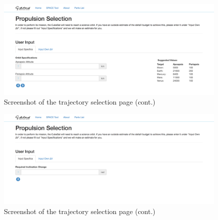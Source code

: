 \documentclass[a4, 12 pt]{article} %
\begin{document}
\begin{figure}[H]
\begin{center}
\includegraphics[width=\linewidth]{4b}
\caption{Screenshot of the trajectory selection page (cont.)}
\label{default}
\end{center}
\end{figure}

\begin{figure}[H]
\begin{center}
\includegraphics[width=\linewidth]{4c}
\caption{Screenshot of the trajectory selection page (cont.)}
\label{default}
\end{center}
\end{figure}
\end{document}
